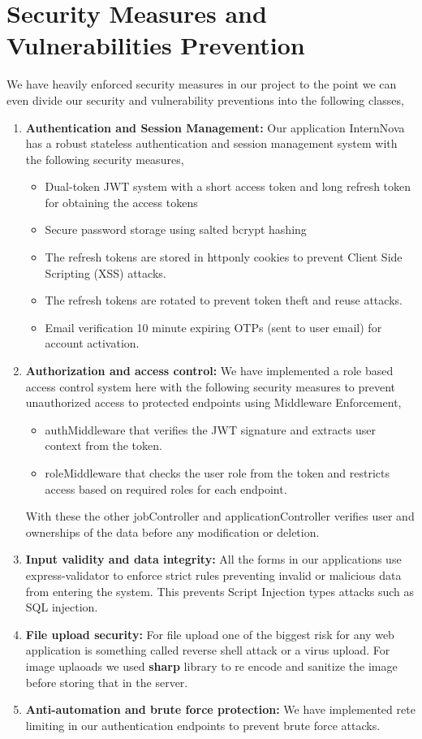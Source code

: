 \documentclass[a4paper, 14pt, openany]{extreport}
\begin{document}
	\section{Security Measures and Vulnerabilities Prevention}
	We have heavily enforced security measures in our project to the point we can even divide our security and vulnerability preventions into the following classes, 
	\begin{enumerate}
		\item \textbf{Authentication and Session Management:} Our application InternNova has a robust stateless authentication and session management system with the following security measures,
		\begin{itemize}
			\item Dual-token JWT system with a short access token and long refresh token for obtaining the access tokens
			\item Secure password storage using salted bcrypt hashing
			\item The refresh tokens are stored in httponly cookies to prevent Client Side Scripting (XSS) attacks.
			\item The refresh tokens are rotated to prevent token theft and reuse attacks.
			\item Email verification 10 minute expiring OTPs (sent to user email) for account activation.
		\end{itemize}
		\item \textbf{Authorization and access control:} We have implemented a role based access control system here with the following security measures to prevent unauthorized access to protected endpoints using Middleware Enforcement,
		\begin{itemize}
			\item authMiddleware that verifies the JWT signature and extracts user context from the token.
			\item roleMiddleware that checks the user role from the token and restricts access based on required roles for each endpoint.
		\end{itemize}
		With these the other jobController and applicationController verifies user and ownerships of the data before any modification or deletion.
		\item \textbf{Input validity and data integrity:} All the forms in our applications use express-validator to enforce strict rules preventing invalid or malicious data from entering the system. This prevents Script Injection types attacks such as SQL injection.
		\item \textbf{File upload security:} For file upload one of the biggest risk for any web application is something called reverse shell attack or a virus upload. For image uplaoads we used \textbf{sharp} library to re encode and sanitize the image before storing that in the server.
		\item \textbf{Anti-automation and brute force protection:} We have implemented rete limiting in our authentication endpoints to prevent brute force attacks.
	\end{enumerate}
\end{document}
